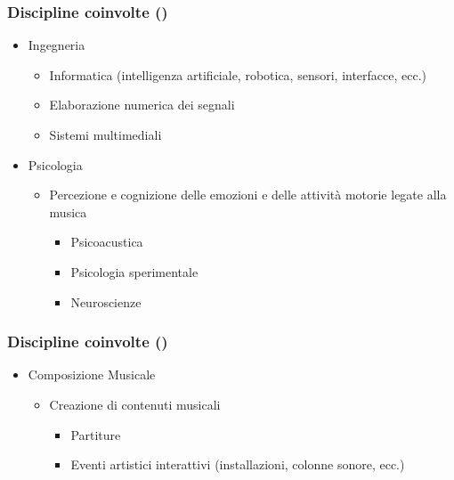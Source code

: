 \begin{frame}
    \frametitle{Discipline coinvolte ()}

    \begin{itemize}
        \item{Ingegneria}
            \begin{itemize}
                \item{Informatica (intelligenza artificiale, robotica,
                    sensori, interfacce, ecc.)}
                \item{Elaborazione numerica dei segnali}
                \item{Sistemi multimediali}
            \end{itemize}
        \item{Psicologia}
            \begin{itemize}
                \item{Percezione e cognizione delle emozioni e delle
                    attivit\`a motorie legate alla musica}
                    \begin{itemize}
                        \item{Psicoacustica}
                        \item{Psicologia sperimentale}
                        \item{Neuroscienze}
                    \end{itemize}
            \end{itemize}
    \end{itemize}
    
\end{frame}

\begin{frame}
    \frametitle{Discipline coinvolte ()}

    \begin{itemize}
        \item{Composizione Musicale}
            \begin{itemize}
                \item{Creazione di contenuti musicali}
                    \begin{itemize}
                        \item{Partiture}
                        \item{Eventi artistici interattivi (installazioni,
                            colonne sonore, ecc.)}
                    \end{itemize}
            \end{itemize}
    \end{itemize}
    
\end{frame}

